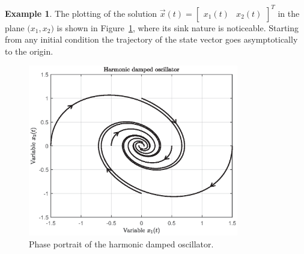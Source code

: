 \documentclass[11pt,a4paper,oneside]{book}
\numberwithin{equation}{section}
\theoremstyle{it}
\theoremstyle{definition}
\newtheorem{example}{Example}[chapter]
\begin{document}
\begin{example}
The plotting of the solution $\vec{x}(t) = \begin{bmatrix} x_1(t) & x_2(t) 
\end{bmatrix}^T$ in the plane $\big(x_1 , x_2\big)$ is shown in 
Figure~\ref{figure_armonic_damped_oscillator}, where its sink nature is 
noticeable. Starting from any initial condition the trajectory of the state 
vector goes asymptotically to the origin.
\begin{figure}[H]
	\centering
	\includegraphics[width = 260pt, keepaspectratio]{figures/harmonic_damped_oscillator.eps}
	\captionsetup{width=0.75\textwidth}		
	\caption{Phase portrait of the harmonic damped oscillator.}
	\label{figure_armonic_damped_oscillator}
\end{figure}


\end{example}
\end{document}
